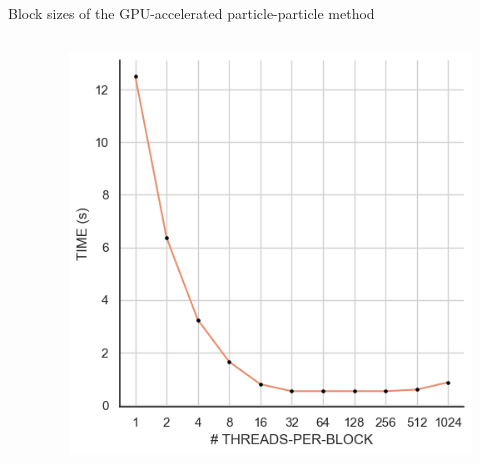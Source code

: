 \documentclass[8pt]{beamer}
\begin{document}
\begin{frame}{Block sizes of the GPU-accelerated particle-particle method}

    \begin{columns}
         {
            \centering
        }
         {
            \centering
            \begin{figure}
                \centering
                \includegraphics[width=\textwidth]{img/threadsperblock.png}
            \end{figure}
        }
    \end{columns}


\end{frame}




\end{document}
